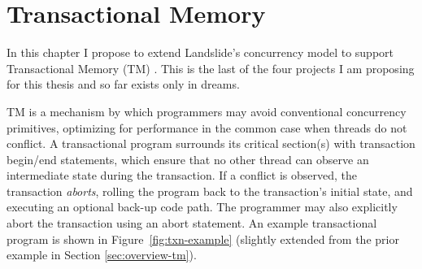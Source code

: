 \chapter{Transactional Memory}
\label{chap:tm}

In this chapter I propose to extend Landslide's concurrency model to support Transactional Memory (TM) \cite{transactional-memory}.
This is the last of the four projects I am proposing for this thesis and so far exists only in dreams.

TM is a mechanism by which programmers may avoid conventional concurrency primitives, optimizing for performance in the common case when threads do not conflict.
A transactional program surrounds its critical section(s) with transaction begin/end statements, which ensure that no other thread can observe an intermediate state during the transaction.
If a conflict is observed, the transaction {\em aborts}, rolling the program back to the transaction's initial state, and executing an optional back-up code path.
The programmer may also explicitly abort the transaction using an abort statement.
An example transactional program is shown in Figure~\ref{fig:txn-example} (slightly extended from the prior example in Section \ref{sec:overview-tm}).

